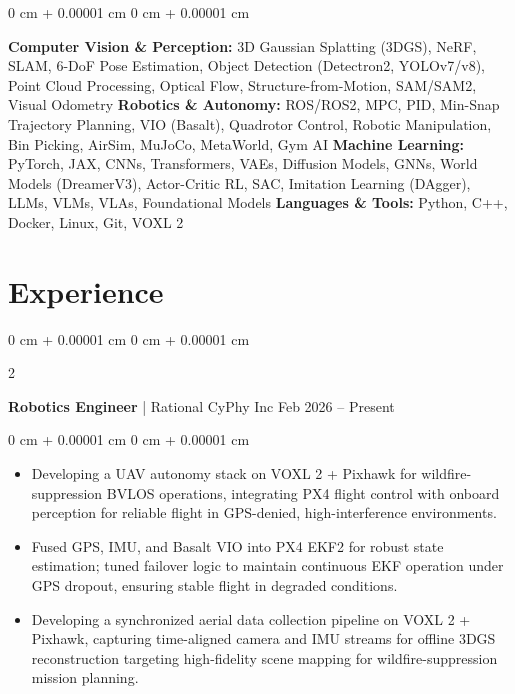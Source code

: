 \documentclass[10pt, letterpaper]{article}
\newenvironment{highlights}{
    \begin{itemize}[
        topsep=0.10 cm,
        parsep=0.10 cm,
        partopsep=0pt,
        itemsep=0pt,
        leftmargin=0 cm + 10pt
    ]
}{
    \end{itemize}
} %
\newenvironment{onecolentry}{
    \begin{adjustwidth}{
        0 cm + 0.00001 cm
    }{
        0 cm + 0.00001 cm
    }
}{
    \end{adjustwidth}
} %
\newenvironment{twocolentry}[2][]{
    \onecolentry
    \def\secondColumn{#2}
    \setcolumnwidth{\fill, 4.5 cm}
    \begin{paracol}{2}
}{
    \switchcolumn \raggedleft \secondColumn
    \end{paracol}
    \endonecolentry
} %
\begin{document}
        \begin{onecolentry}
            \textbf{Computer Vision \& Perception:} 3D Gaussian Splatting (3DGS), NeRF, SLAM, 6-DoF Pose Estimation, Object Detection (Detectron2, YOLOv7/v8), Point Cloud Processing, Optical Flow, Structure-from-Motion, SAM/SAM2, Visual Odometry
            \newline
            \textbf{Robotics \& Autonomy:} ROS/ROS2, MPC, PID, Min-Snap Trajectory Planning, VIO (Basalt), Quadrotor Control, Robotic Manipulation, Bin Picking, AirSim, MuJoCo, MetaWorld, Gym AI
            \newline
            \textbf{Machine Learning:} PyTorch, JAX, CNNs, Transformers, VAEs, Diffusion Models, GNNs, World Models (DreamerV3), Actor-Critic RL, SAC, Imitation Learning (DAgger), LLMs, VLMs, VLAs, Foundational Models
            \newline
            \textbf{Languages \& Tools:} Python, C++, Docker, Linux, Git, VOXL 2
        \end{onecolentry}



    
    \section{Experience}

    \begin{twocolentry}{
            Feb 2026 – Present
        }
            \textbf{Robotics Engineer} | Rational CyPhy Inc\end{twocolentry}

        \vspace{0.05 cm}
        \begin{onecolentry}
            \begin{highlights}
                \item Developing a UAV autonomy stack on VOXL 2 + Pixhawk for wildfire-suppression BVLOS operations, integrating PX4 flight control with onboard perception for reliable flight in GPS-denied, high-interference environments.
                \item Fused GPS, IMU, and Basalt VIO into PX4 EKF2 for robust state estimation; tuned failover logic to maintain continuous EKF operation under GPS dropout, ensuring stable flight in degraded conditions.
                \item Developing a synchronized aerial data collection pipeline on VOXL 2 + Pixhawk, capturing time-aligned camera and IMU streams for offline 3DGS reconstruction targeting high-fidelity scene mapping for wildfire-suppression mission planning.
            \end{highlights}
        \end{onecolentry}
\end{document}
